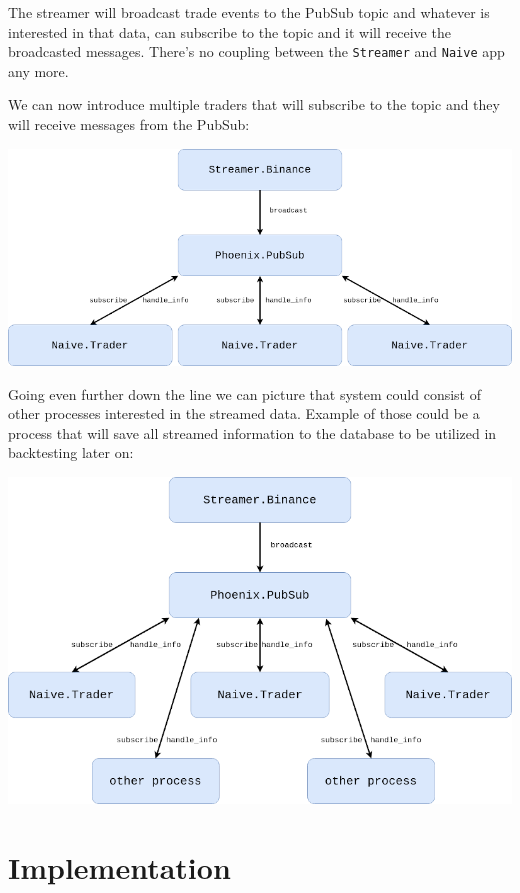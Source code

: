 \documentclass[
  oneside]{book}
\begin{document}
The streamer will broadcast trade events to the PubSub topic and whatever is interested in that data, can subscribe to the topic and it will receive the broadcasted messages.
There's no coupling between the \texttt{Streamer} and \texttt{Naive} app any more.

We can now introduce multiple traders that will subscribe to the topic and
they will receive messages from the PubSub:

\includegraphics{images/chapter_03_04_naive_trader_group.png}

Going even further down the line we can picture that system could consist of other processes interested in the streamed data. Example of those could be a process that will save all streamed information to the database to be utilized in backtesting later on:

\includegraphics{images/chapter_03_05_other_services.png}

\hypertarget{implementation}{%
\section{Implementation}\label{implementation}}
\end{document}
